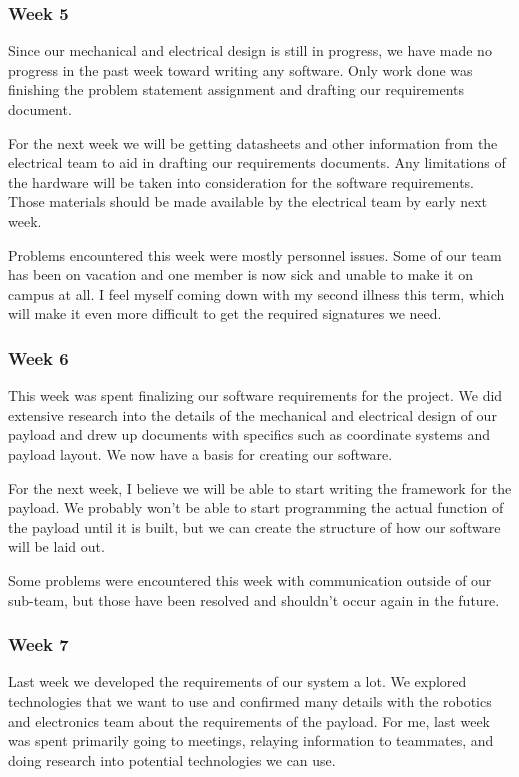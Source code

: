 \subsubsection{Week 5}
Since our mechanical and electrical design is still in progress, we have made no progress in the past week toward writing any software. Only work done was finishing the problem statement assignment and drafting our requirements document.

For the next week we will be getting datasheets and other information from the electrical team to aid in drafting our requirements documents. Any limitations of the hardware will be taken into consideration for the software requirements. Those materials should be made available by the electrical team by early next week.

Problems encountered this week were mostly personnel issues. Some of our team has been on vacation and one member is now sick and unable to make it on campus at all. I feel myself coming down with my second illness this term, which will make it even more difficult to get the required signatures we need.

\subsubsection{Week 6}
This week was spent finalizing our software requirements for the project. We did extensive research into the details of the mechanical and electrical design of our payload and drew up documents with specifics such as coordinate systems and payload layout. We now have a basis for creating our software.

For the next week, I believe we will be able to start writing the framework for the payload. We probably won't be able to start programming the actual function of the payload until it is built, but we can create the structure of how our software will be laid out.

Some problems were encountered this week with communication outside of our sub-team, but those have been resolved and shouldn't occur again in the future.

\subsubsection{Week 7}
Last week we developed the requirements of our system a lot. We explored technologies that we want to use and confirmed many details with the robotics and electronics team about the requirements of the payload. For me, last week was spent primarily going to meetings, relaying information to teammates, and doing research into potential technologies we can use.

